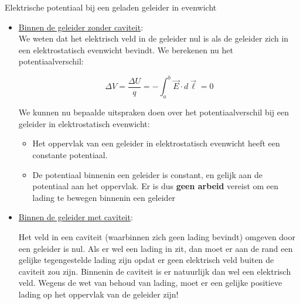 \newpage

\begin{app}{Elektrische potentiaal bij een geladen geleider in evenwicht}

    \begin{itemize}
        \item{\underline{Binnen de geleider zonder caviteit}:} \\
        
        We weten dat het elektrisch veld in de geleider nul is als de geleider zich in een elektrostatisch evenwicht bevindt. We berekenen nu het potentiaalverschil:
        
        \begin{equation*}
            \Delta V = \dfrac{\Delta U}{q} = - \int_a^b \Vec{E} \cdot d\Vec{\ell} = 0
        \end{equation*}
                
        \noindent We kunnen nu bepaalde uitspraken doen over het potentiaalverschil bij een geleider in elektrostatisch evenwicht:
        
        \begin{itemize}
            \item Het oppervlak van een geleider in elektrostatisch evenwicht heeft een constante potentiaal.
            \item  De potentiaal binnenin een geleider is constant, en gelijk aan de potentiaal aan het oppervlak. Er is dus \textbf{geen arbeid} vereist om een lading te bewegen binnenin een geleider
        \end{itemize}
        
        \item{\underline{Binnen de geleider met caviteit}:}
        
        \begin{minipage}{.48\textwidth}
        Het veld in een caviteit (waarbinnen zich geen lading bevindt) omgeven door een geleider is nul. Als er wel een lading in zit, dan moet er aan de rand een gelijke tegengestelde lading zijn opdat er geen elektrisch veld buiten de caviteit zou zijn. Binnenin de caviteit is er natuurlijk dan wel een elektrisch veld. Wegens de wet van behoud van lading, moet er een gelijke positieve lading op het oppervlak van de geleider zijn!
        

\end{minipage}
\end{itemize}
\end{app}
